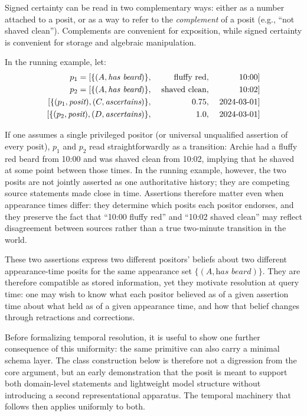 \documentclass[a4paper,fleqn]{cas-sc}
\begin{document}
Signed certainty can be read in two complementary ways: either as a number attached to a posit, or as a way to refer to the \emph{complement} of a posit (e.g., ``not shaved clean''). Complements are convenient for exposition, while signed certainty is convenient for storage and algebraic manipulation.

In the running example, let:
\begin{alignat*}{3}
p_{1} = [\{(A, \textit{has beard})\},\;&& \textrm{fluffy red},\;&& \textrm{10:00}] \\
p_{2} = [\{(A, \textit{has beard})\},\;&& \textrm{shaved clean},\;&& \textrm{10:02}] \\
[\{(p_{1}, \textit{posit}), (C, \textit{ascertains})\},\;&& 0.75,\;&& \textrm{2024\text{-}03\text{-}01}] \\
[\{(p_{2}, \textit{posit}), (D, \textit{ascertains})\},\;&& 1.0,\;&& \textrm{2024\text{-}03\text{-}01}]
\end{alignat*}

If one assumes a single privileged positor (or universal unqualified assertion of every posit), \(p_1\) and \(p_2\) read straightforwardly as a transition: Archie had a fluffy red beard from 10:00 and was shaved clean from 10:02, implying that he shaved at some point between those times. In the running example, however, the two posits are not jointly asserted as one authoritative history; they are competing source statements made close in time. Assertions therefore matter even when appearance times differ: they determine which posits each positor endorses, and they preserve the fact that ``10:00 fluffy red'' and ``10:02 shaved clean'' may reflect disagreement between sources rather than a true two-minute transition in the world.

These two assertions express two different positors' beliefs about two different appearance-time posits for the same appearance set \(\{(A,\textit{has beard})\}\). They are therefore compatible as stored information, yet they motivate resolution at query time: one may wish to know what each positor believed as of a given assertion time about what held as of a given appearance time, and how that belief changes through retractions and corrections.

Before formalizing temporal resolution, it is useful to show one further consequence of this uniformity: the same primitive can also carry a minimal schema layer. The class construction below is therefore not a digression from the core argument, but an early demonstration that the posit is meant to support both domain-level statements and lightweight model structure without introducing a second representational apparatus. The temporal machinery that follows then applies uniformly to both.
\end{document}
